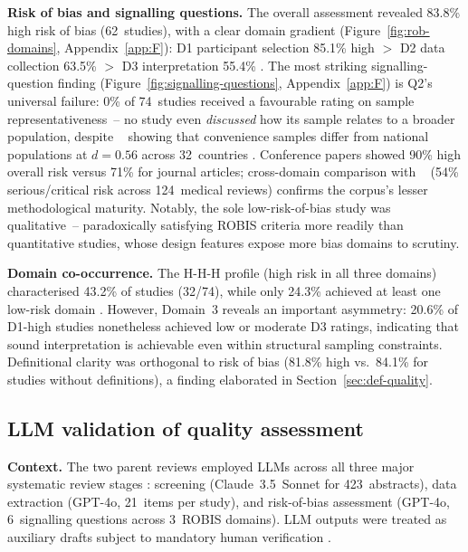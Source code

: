 \textbf{Risk of bias and signalling questions.} \label{sec:rob-results} The overall assessment revealed 83.8\% high risk of bias (62~studies), with a clear domain gradient (Figure~\ref{fig:rob-domains}, Appendix~\ref{app:F}): D1 participant selection 85.1\% high $>$ D2 data collection 63.5\% $>$ D3 interpretation 55.4\% \cite{Korniienko2025mrqs, Whiting2016}. The most striking signalling-question finding (Figure~\ref{fig:signalling-questions}, Appendix~\ref{app:F}) is Q2's universal failure: 0\% of 74~studies received a favourable rating on sample representativeness~-- no study even \emph{discussed} how its sample relates to a broader population, despite \citeauthor{Wild2022}~\cite{Wild2022} showing that convenience samples differ from national populations at $d = 0.56$ across 32~countries \cite{Schulz2010CONSORT}. Conference papers showed 90\% high overall risk versus 71\% for journal articles; cross-domain comparison with \citeauthor{Igelstrom2021}~\cite{Igelstrom2021} (54\% serious/critical risk across 124~medical reviews) confirms the corpus's lesser methodological maturity. Notably, the sole low-risk-of-bias study \cite{15Slater2022} was qualitative~-- paradoxically satisfying ROBIS criteria more readily than quantitative studies, whose design features expose more bias domains to scrutiny.

\textbf{Domain co-occurrence.} \label{sec:domain-cooccurrence} The H-H-H profile (high risk in all three domains) characterised 43.2\% of studies (32/74), while only 24.3\% achieved at least one low-risk domain \cite{Korniienko2025mrqs, Whiting2016}. However, Domain~3 reveals an important asymmetry: 20.6\% of D1-high studies nonetheless achieved low or moderate D3 ratings, indicating that sound interpretation is achievable even within structural sampling constraints. Definitional clarity was orthogonal to risk of bias (81.8\% high vs.\ 84.1\% for studies without definitions), a finding elaborated in Section~\ref{sec:def-quality}.

\subsection{LLM validation of quality assessment} \label{sec:llm-validation}

\textbf{Context.} \label{sec:llm-context} The two parent reviews employed LLMs across all three major systematic review stages \cite{Korniienko2025mrqs, Blaizot2022}: screening (Claude~3.5~Sonnet for 423~abstracts), data extraction (GPT-4o, 21~items per study), and risk-of-bias assessment (GPT-4o, 6~signalling questions across 3~ROBIS domains). LLM outputs were treated as auxiliary drafts subject to mandatory human verification \cite{Khraisha2023}.

